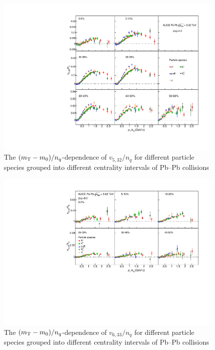 \begin{figure}[htb]
\begin{center}
\includegraphics[scale=0.82]{figures/scaling/All_v523_gap00_KET_3by3.pdf}

\end{center}
\caption{The $(m_{\rm{T}} - m_{0})/n_{q}$-dependence of $v_{5,32}/n_{q}$ for different particle species grouped into different centrality intervals of Pb--Pb collisions \sNN}
\label{v523_KET}
\end{figure}

\begin{figure}[htb]
\begin{center}
\includegraphics[scale=0.82]{figures/scaling/All_v633_gap00_KET_3by2.pdf}

\end{center}
\caption{The $(m_{\rm{T}} - m_{0})/n_{q}$-dependence of $v_{6,33}/n_{q}$ for different particle species grouped into different centrality intervals of Pb--Pb collisions \sNN}
\label{v633_KET}
\end{figure}

